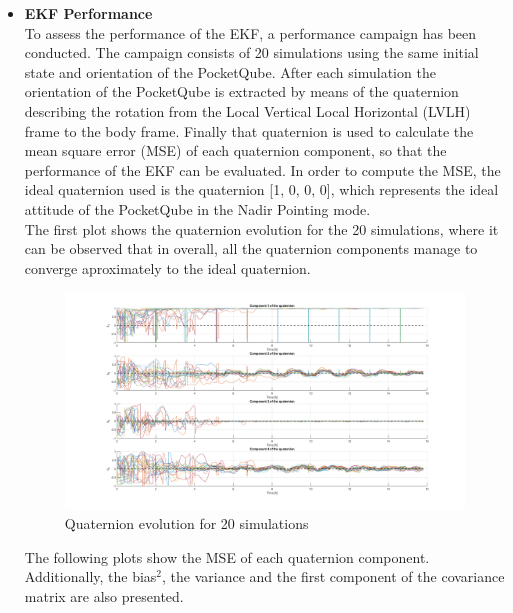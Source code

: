 \begin{itemize}
    \item \textbf{EKF Performance}\\
    To assess the performance of the EKF, a performance campaign has been conducted. The campaign consists of 20 simulations using the same
    initial state and orientation of the PocketQube. After each simulation the orientation of the PocketQube is extracted by means of the quaternion
    describing the rotation from the Local Vertical Local Horizontal (LVLH) frame to the body frame. Finally that quaternion is used to calculate
    the mean square error (MSE) of each quaternion component, so that the performance of the EKF can be evaluated. In order to compute the MSE, the ideal
    quaternion used is the quaternion [1, 0, 0, 0], which represents the ideal attitude of the PocketQube in the Nadir Pointing mode.\\
    
    The first plot shows the quaternion evolution for the 20 simulations, where it can be observed that in overall, all the quaternion components
    manage to converge aproximately to the ideal quaternion.

    \begin{figure}[H]
        \centering
        \includegraphics[width=1\linewidth]{res/img/Nadir_EKF/EKF_performance/20_SIM_quat.png}
        \caption{Quaternion evolution for 20 simulations}
        \label{fig:EKF_20_SIM_quat}
    \end{figure}

    The following plots show the MSE of each quaternion component. Additionally, the bias$^2$, the variance and the first component
    of the covariance matrix are also presented.


\end{itemize}
